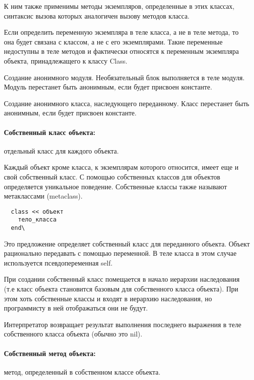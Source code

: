 К ним также применимы методы экземпляров, определенные в этих классах, синтаксис вызова которых аналогичен вызову методов класса. 

Если определить переменную экземпляра в теле класса, а не в теле метода, то она будет связана с классом, а не с его экземплярами. Такие переменные недоступны в теле методов и фактически относятся к переменным экземпляра объекта, принадлежащего к классу Class.

\begin{methodlist}
  Создание анонимного модуля. Необязательный блок выполняется в теле модуля. Модуль перестанет быть анонимным, если будет присвоен константе. 

  Создание анонимного класса, наследующего переданному. Класс перестанет быть анонимным, если будет присвоен константе.
\end{methodlist}

\paragraph*{Собственный класс объекта:} отдельный класс для каждого объекта.

Каждый объект кроме класса, к экземплярам которого относится, имеет еще и свой собственный класс. С помощью собственных классов для объектов определяется уникальное поведение. Собственные классы также называют метаклассами (metaclass).
\begin{verbatim}
  class << объект
    тело_класса
  end\
\end{verbatim}

Это предложение определяет собственный класс для переданного объекта. Объект рационально передавать с помощью переменной. В теле класса в этом случае используется псевдопеременная self.

При создании собственный класс помещается в начало иерархии наследования (т.е класс объекта становится базовым для собственного класса объекта). При этом хоть собственные классы и входят в иерархию наследования, но программисту в ней отображаться они не будут.

Интерпретатор возвращает результат выполнения последнего выражения в теле собственного класса объекта (обычно это nil).

\paragraph*{Собственный метод объекта:} метод, определенный в собственном классе объекта.

